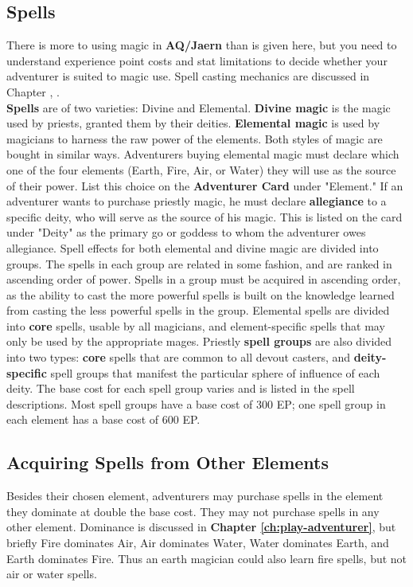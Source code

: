 \begin{multicols*}{2}
\section{Spells}
There is more to using magic in \textbf{AQ/Jaern} than is given here, but you need to understand experience point costs
and stat limitations to decide whether your adventurer is suited to magic use. Spell casting mechanics are discussed in Chapter \textbf{}, \tcpage{\pageref{ch:play-adventurer}}.\\
\textbf{Spells} are of two varieties: Divine and Elemental. \textbf{Divine magic} is the magic used by priests, granted them by their deities. \textbf{Elemental magic} is used by magicians to harness the raw power of the elements. Both styles of magic
are bought in similar ways.
Adventurers buying elemental magic must declare which one of the four elements (Earth, Fire, Air, or Water) they will use as the source of their power. List this choice on the \textbf{Adventurer Card} under "Element."
If an adventurer wants to purchase priestly magic, he must declare \textbf{allegiance} to a specific deity, who will serve as the source of his magic. This is listed on the card under "Deity" as the primary go or goddess to whom the adventurer owes allegiance.
Spell effects for both elemental and divine magic are divided into groups. The spells in each group are related in some fashion, and are ranked in ascending order of power.
Spells in a group must be acquired in ascending order, as the ability to cast the more powerful spells is built on the knowledge learned from casting the less powerful spells in the group.
Elemental spells are divided into \textbf{core} spells, usable by all magicians, and element-specific spells that may only be used by the appropriate mages.
Priestly \textbf{spell groups} are also divided into two types: \textbf{core} spells that are common to all devout casters, and \textbf{deity-specific} spell groups that manifest the particular sphere of influence of each deity.
The base cost for each spell group varies and is listed in the spell descriptions. Most spell groups have a base cost of 300 EP; one spell group in each element has a base
cost of 600 EP.
\subsection{Acquiring Spells from Other Elements}
Besides their chosen element, adventurers may purchase spells in the element they dominate at double the base cost. They may not purchase spells in any other element.
Dominance is discussed in \textbf{Chapter \ref{ch:play-adventurer}}, but briefly Fire dominates Air, Air dominates Water, Water dominates Earth, and Earth dominates Fire. Thus an earth magician could also learn fire spells, but not air or water spells.

\end{multicols*}
